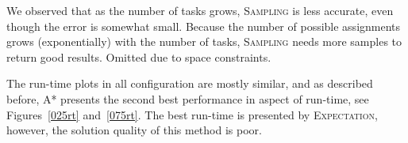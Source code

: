 \documentclass[letterpaper]{article} %
\newcommand{\astar}{\textsc{A*}\xspace}
\newcommand{\sampling}{\textsc{Sampling}\xspace}
\newcommand{\expectation}{\textsc{Expectation}\xspace}
\newcommand{\commentout}[1]{}
\begin{document}
\commentout{
\begin{figure}[h!]
	\scriptsize	
	\begin{tikzpicture}
	\begin{axis}[
	scale=0.7,
	xlabel={\#Tasks},
	ylabel near ticks,
	ylabel={\#Opt assignments},
	xmin=4, xmax=8,
	ymin=0, ymax=30,
	legend pos=outer north east,
	ymajorgrids=true,
	grid style=dashed,
	]
	
	\addplot[
	color=blue,
	mark=x,
	]
	coordinates { 
		(4 , 30) 
		(5 , 30) 
		(6 , 30)
		(7 , 30) 
		(8 , 30)
		
	};
	\addlegendentry{BF}
	
	\addplot[
	color=gray,
	mark=x,
	]
	coordinates { 
		(4 , 30) 
		(5 , 30) 
		(6 , 30)
		(7 , 30) 
		(8 , 30)
		
	};
	\addlegendentry{\astar}
	
	\addplot[
	color=green,
	mark=o,
	]
	coordinates { 
		(4 , 30) 
		(5 , 29) 
		(6 , 25)
		(7 , 21) 
        (8 , 22)
	};
	\addlegendentry{\sampling}
	
	
	\addplot[
	color=red,
	mark=square,
	]
	coordinates {
		(4 , 28) 
		(5 , 24) 
		(6 , 21)
		(7 , 27)
		(8 , 27)

	};
	\addlegendentry{\expectation}
	
	
	
	\end{axis}
	\end{tikzpicture}
	\caption{Number of optimal assignments comparison of all heuristic algorithms for deadline of size $0.5\cdot maxd$ and ``Structural" distribution}\label{05reg}
\end{figure}}


We observed that as the number of tasks grows, \sampling is less accurate, even though the error is somewhat small. Because the number of possible assignments grows (exponentially) with the number of tasks, \sampling needs more samples to return good results. Omitted due to space constraints.

The run-time plots in all configuration are mostly similar, and as described before, \astar presents the second best performance in aspect of run-time, see Figures~\ref{025rt} and~\ref{075rt}. 
The best run-time is presented by \expectation, however, the solution quality of this method is poor.
\end{document}
